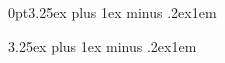 \titleformat{\paragraph}[runin]
{\normalfont\normalsize\bfseries}{\theparagraph}{1em}{}
\titlespacing*{\paragraph} {0pt}{3.25ex plus 1ex minus .2ex}{1em}

\titleformat{\subparagraph}[runin]
{\normalfont\normalsize\bfseries}{\thesubparagraph}{1em}{}
\titlespacing*{\subparagraph} {\parindent}{3.25ex plus 1ex minus .2ex}{1em}




\setlength{\columnsep}{0.5em}
\setlength{\columnseprule}{1pt}
\overfullrule=1mm
